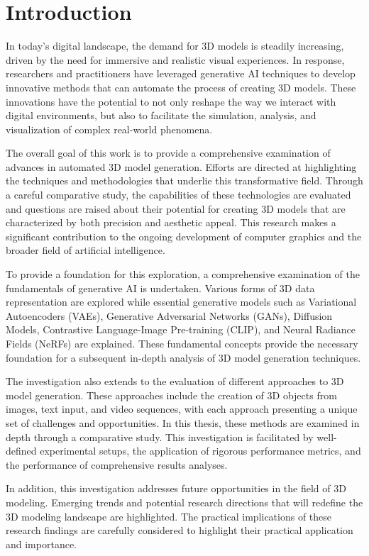 \chapter{Introduction}
\label{ch:introduction}

In today's digital landscape, the demand for 3D models is steadily increasing, driven by the need for immersive and realistic visual experiences. In response, researchers and practitioners have leveraged generative AI techniques to develop innovative methods that can automate the process of creating 3D models. These innovations have the potential to not only reshape the way we interact with digital environments, but also to facilitate the simulation, analysis, and visualization of complex real-world phenomena.

The overall goal of this work is to provide a comprehensive examination of advances in automated 3D model generation. Efforts are directed at highlighting the techniques and methodologies that underlie this transformative field. Through a careful comparative study, the capabilities of these technologies are evaluated and questions are raised about their potential for creating 3D models that are characterized by both precision and aesthetic appeal. This research makes a significant contribution to the ongoing development of computer graphics and the broader field of artificial intelligence.

To provide a foundation for this exploration, a comprehensive examination of the fundamentals of generative AI is undertaken. Various forms of 3D data representation are explored while essential generative models such as Variational Autoencoders (VAEs), Generative Adversarial Networks (GANs), Diffusion Models, Contrastive Language-Image Pre-training (CLIP), and Neural Radiance Fields (NeRFs) are explained. These fundamental concepts provide the necessary foundation for a subsequent in-depth analysis of 3D model generation techniques.

The investigation also extends to the evaluation of different approaches to 3D model generation. These approaches include the creation of 3D objects from images, text input, and video sequences, with each approach presenting a unique set of challenges and opportunities. In this thesis, these methods are examined in depth through a comparative study. This investigation is facilitated by well-defined experimental setups, the application of rigorous performance metrics, and the performance of comprehensive results analyses.

In addition, this investigation addresses future opportunities in the field of 3D modeling. Emerging trends and potential research directions that will redefine the 3D modeling landscape are highlighted. The practical implications of these research findings are carefully considered to highlight their practical application and importance.